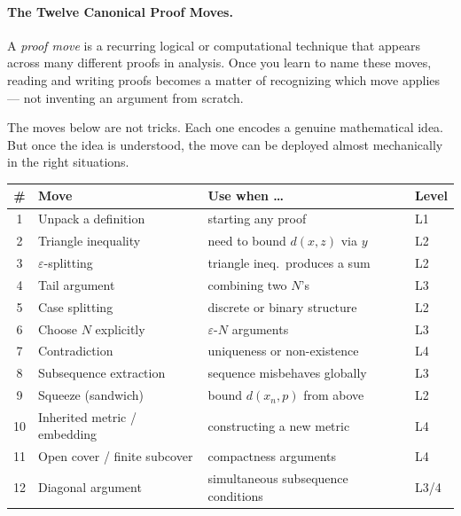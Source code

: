\paragraph{The Twelve Canonical Proof Moves.}

A \emph{proof move} is a recurring logical or computational technique
that appears across many different proofs in analysis. Once you learn
to name these moves, reading and writing proofs becomes a matter of
recognizing which move applies --- not inventing an argument from scratch.

The moves below are not tricks. Each one encodes a genuine mathematical
idea. But once the idea is understood, the move can be deployed almost
mechanically in the right situations.

\begin{tcolorbox}[colback=gray!6, colframe=gray!40, arc=2pt,
  left=6pt, right=6pt, top=4pt, bottom=4pt,
  title={\small\textbf{The Twelve Moves at a Glance}},
  fonttitle=\small\bfseries]
\small
\renewcommand{\arraystretch}{1.25}
\begin{tabular}{clll}
\toprule
\textbf{\#} & \textbf{Move} & \textbf{Use when \ldots} & \textbf{Level} \\
\midrule
1  & Unpack a definition & starting any proof & L1 \\
2  & Triangle inequality & need to bound $d(x,z)$ via $y$ & L2 \\
3  & $\varepsilon$-splitting & triangle ineq.\ produces a sum & L2 \\
4  & Tail argument & combining two $N$'s & L3 \\
5  & Case splitting & discrete or binary structure & L2 \\
6  & Choose $N$ explicitly & $\varepsilon$-$N$ arguments & L3 \\
7  & Contradiction & uniqueness or non-existence & L4 \\
8  & Subsequence extraction & sequence misbehaves globally & L3 \\
9  & Squeeze (sandwich) & bound $d(x_n,p)$ from above & L2 \\
10 & Inherited metric / embedding & constructing a new metric & L4 \\
11 & Open cover / finite subcover & compactness arguments & L4 \\
12 & Diagonal argument & simultaneous subsequence conditions & L3/4 \\
\bottomrule
\end{tabular}
\end{tcolorbox}


